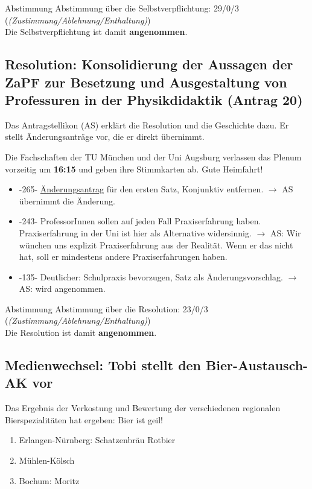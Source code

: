     \begin{success}{Abstimmung}
      Abstimmung über die Selbstverpflichtung: 29/0/3 (\textit{(Zustimmung/Ablehnung/Enthaltung)}) \\
      Die Selbstverpflichtung ist damit \textbf{angenommen}.
    \end{success}

  \subsection{Resolution: Konsolidierung der Aussagen der ZaPF zur Besetzung und Ausgestaltung von Professuren in der Physikdidaktik (Antrag 20)}
    Das Antragstellikon (AS) erklärt die Resolution und die Geschichte dazu. Er stellt Änderungsanträge vor, die er direkt übernimmt.

    \begin{info}{}
      Die Fachschaften der TU München und der Uni Augsburg verlassen das Plenum vorzeitig um \textbf{16:15} und geben ihre Stimmkarten ab. Gute Heimfahrt!
    \end{info}

    \begin{itemize}
      \item -265- \underline{Änderungsantrag} für den ersten Satz, Konjunktiv entfernen.
        $\rightarrow$ AS übernimmt die Änderung.
      \item -243- ProfessorInnen sollen auf jeden Fall Praxiserfahrung haben. Praxiserfahrung in der Uni ist hier als Alternative widersinnig.
        $\rightarrow$ AS: Wir wünchen uns explizit Praxiserfahrung aus der Realität. Wenn er das nicht hat, soll er mindestens andere Praxiserfahrungen haben.
      \item -135- Deutlicher: Schulpraxis bevorzugen, Satz als Änderungsvorschlag.
        $\rightarrow$ AS: wird angenommen.
    \end{itemize}

    \begin{success}{Abstimmung}
      Abstimmung über die Resolution: 23/0/3 (\textit{(Zustimmung/Ablehnung/Enthaltung)}) \\
      Die Resolution ist damit \textbf{angenommen}.
    \end{success}

  \subsection{Medienwechsel: Tobi stellt den Bier-Austausch-AK vor}
    Das Ergebnis der Verkostung und Bewertung der verschiedenen regionalen Bierspezialitäten hat ergeben: Bier ist geil!
    \begin{enumerate}
      \item Erlangen-Nürnberg: Schatzenbräu Rotbier
      \item Mühlen-Kölsch
      \item Bochum: Moritz
    \end{enumerate}

